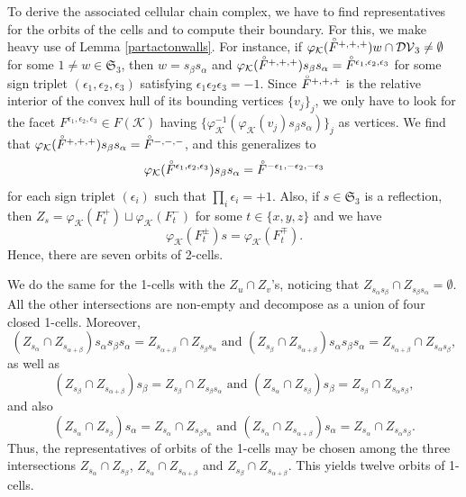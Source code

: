 \documentclass[11pt,twoside]{amsart}
\theoremstyle{plain}
\newcommand{\Sym}{\mathfrak{S}}
\newcommand{\interior}[1]{\accentset{\circ}{#1}}
\begin{document}
To derive the associated cellular chain complex, we have to find representatives for the orbits of the cells and to compute their boundary. For this, we make heavy use of Lemma \ref{partactonwalls}. For instance, if $\varphi_{\mathcal{K}}(\interior{F}^{+,+,+})w\cap\mathcal{DV}_3\ne\emptyset$ for some $1\ne w\in\Sym_3$, then $w=s_\beta s_\alpha$ and $\varphi_{\mathcal{K}}(\interior{F}^{+,+,+})s_\beta s_\alpha=\interior{F}^{\epsilon_1,\epsilon_2,\epsilon_3}$ for some sign triplet $(\epsilon_1,\epsilon_2,\epsilon_3)$ satisfying $\epsilon_1\epsilon_2\epsilon_3=-1$. Since $\interior{F}^{+,+,+}$ is the relative interior of the convex hull of its bounding vertices $\{v_j\}_j$, we only have to look for the facet $F^{\epsilon_1,\epsilon_2,\epsilon_3}\in F(\mathcal{K})$ having $\{\varphi_{\mathcal{K}}^{-1}(\varphi_{\mathcal{K}}(v_j)s_\beta s_\alpha)\}_j$ as vertices. We find that $\varphi_{\mathcal{K}}(\interior{F}^{+,+,+})s_\beta s_\alpha=\interior{F}^{-,-,-}$, and this generalizes to
\[\varphi_{\mathcal{K}}(\interior{F}^{\epsilon_1,\epsilon_2,\epsilon_3})s_\beta s_\alpha=\interior{F}^{-\epsilon_1,-\epsilon_2,-\epsilon_3}\]
for each sign triplet $(\epsilon_i)$ such that $\prod_i\epsilon_i=+1$. Also, if $s\in \Sym_3$ is a reflection, then $Z_s=\varphi_{\mathcal{K}}(F^+_t)\sqcup\varphi_{\mathcal{K}}(F^-_t)$ for some $t\in\{x,y,z\}$ and we have
\[\varphi_{\mathcal{K}}(F^{\pm}_t)s=\varphi_{\mathcal{K}}(F^{\mp}_t).\]
Hence, there are seven orbits of 2-cells.

We do the same for the 1-cells with the $Z_u\cap Z_v$'s, noticing that $Z_{s_\alpha s_\beta}\cap Z_{s_\beta s_\alpha}=\emptyset$. All the other intersections are non-empty and decompose as a union of four closed 1-cells. Moreover,
\[(Z_{s_\alpha}\cap Z_{s_{\alpha+\beta}})s_\alpha s_\beta s_\alpha=Z_{s_{\alpha+\beta}}\cap Z_{s_\beta s_\alpha}\text{ and }(Z_{s_\beta}\cap Z_{s_{\alpha+\beta}})s_{\alpha}s_\beta s_\alpha=Z_{s_{\alpha+\beta}}\cap Z_{s_\alpha s_\beta},\]
as well as
\[(Z_{s_\beta}\cap Z_{s_{\alpha+\beta}})s_\beta= Z_{s_\beta}\cap Z_{s_\beta s_\alpha}\text{ and }(Z_{s_\alpha}\cap Z_{s_{\beta}})s_\beta=Z_{s_\beta}\cap Z_{s_\alpha s_\beta},\]
and also
\[(Z_{s_\alpha}\cap Z_{s_\beta})s_\alpha=Z_{s_\alpha}\cap Z_{s_\beta s_\alpha}\text{ and }(Z_{s_\alpha}\cap Z_{s_{\alpha+\beta}})s_\alpha=Z_{s_\alpha}\cap Z_{s_\alpha s_\beta}.\]
Thus, the representatives of orbits of the 1-cells may be chosen among the three intersections $Z_{s_\alpha}\cap Z_{s_\beta}$, $Z_{s_\alpha}\cap Z_{s_{\alpha+\beta}}$ and $Z_{s_\beta}\cap Z_{s_{\alpha+\beta}}$. This yields twelve orbits of 1-cells.
\end{document}
